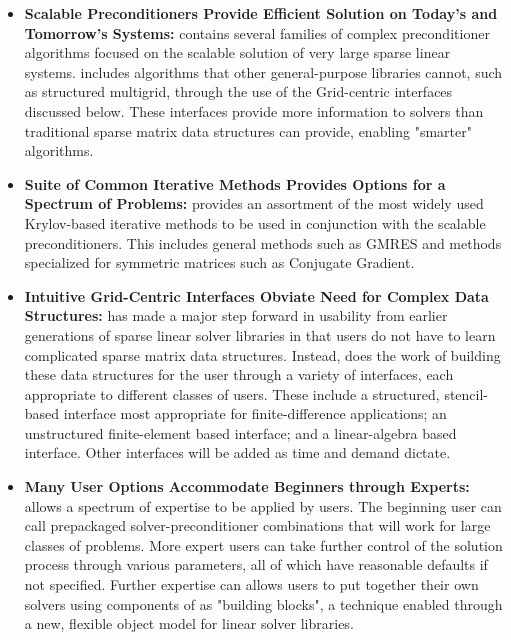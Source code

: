 \begin{itemize}

\item
{\bf Scalable Preconditioners Provide Efficient Solution on Today's and Tomorrow's
Systems:} \hypre{} 
contains several families of complex preconditioner algorithms focused on the
scalable solution of very 
large sparse linear systems. \hypre{} includes algorithms that other
general-purpose libraries cannot, such as 
structured multigrid, through the use of the Grid-centric interfaces discussed
below. These interfaces 
provide more information to solvers than traditional sparse matrix data
structures can provide, enabling 
"smarter" algorithms.

\item
{\bf Suite of Common Iterative Methods Provides Options for a Spectrum of Problems:}
\hypre{} provides 
an assortment of the most widely used Krylov-based iterative methods to be used
in conjunction with the 
scalable preconditioners. This includes general methods such as GMRES and
methods specialized for 
symmetric matrices such as Conjugate Gradient.

\item
{\bf Intuitive Grid-Centric Interfaces Obviate Need for Complex Data Structures:}
\hypre{} has made a 
major step forward in usability from earlier generations of sparse linear
solver libraries in that users do not 
have to learn complicated sparse matrix data structures. Instead, \hypre{} does
the work of building these 
data structures for the user through a variety of interfaces, each appropriate
to different classes of users. 
These include a structured, stencil-based interface most appropriate for
finite-difference applications; an 
unstructured finite-element based interface; and a linear-algebra based
interface. Other interfaces will be 
added as time and demand dictate.

\item
{\bf Many User Options Accommodate Beginners through Experts:} \hypre{} allows a
spectrum of expertise 
to be applied by users. The beginning user can call prepackaged
solver-preconditioner combinations that 
will work for large classes of problems. More expert users can take further
control of the solution process 
through various parameters, all of which have reasonable defaults if not
specified. Further expertise can 
allows users to put together their own solvers using components of \hypre{} as
"building blocks", a 
technique enabled through a new, flexible object model for linear solver
libraries.


\end{itemize}
